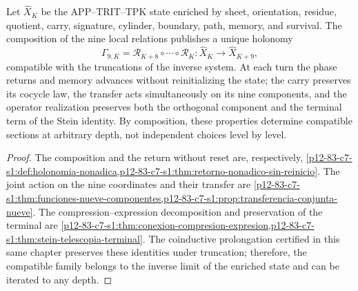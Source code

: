\begin{theorem}
\label{thm:nucleo-continuidad-conexion-nonadica-conjunta}
Let \(\widehat X_K\) be the APP--TRIT--TPK state enriched by sheet,
orientation, residue, quotient, carry, signature, cylinder, boundary, path,
memory, and survival. The composition of the nine local relations
publishes a unique holonomy
\[
 \Gamma_{9,K}=\mathcal R_{K+8}\circ\cdots\circ\mathcal R_K
 :\widehat X_K\longrightarrow\widehat X_{K+9},
\]
compatible with the truncations of the inverse system. At each turn the phase returns
and memory advances without reinitializing the state; the carry preserves
its cocycle law, the transfer acts simultaneously on its nine
components, and the operator realization preserves both the orthogonal
component and the terminal term of the Stein identity. By composition,
these properties determine compatible sections at arbitrary depth,
not independent choices level by level.
\end{theorem}

\begin{proof}
The composition and the return without reset are, respectively,
\cref{p12-83-c7-s1:def:holonomia-nonadica,p12-83-c7-s1:thm:retorno-nonadico-sin-reinicio}.
The joint action on the nine coordinates and their transfer are
\cref{p12-83-c7-s1:thm:funciones-nueve-componentes,p12-83-c7-s1:prop:transferencia-conjunta-nueve}.
The compression--expression decomposition and preservation of the terminal are
\cref{p12-83-c7-s1:thm:conexion-compresion-expresion,p12-83-c7-s1:thm:stein-telescopia-terminal}.
The coinductive prolongation certified in this same chapter preserves these
identities under truncation; therefore, the compatible family belongs to the
inverse limit of the enriched state and can be iterated to any depth.
\end{proof}
